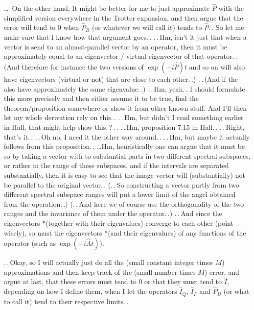 \documentclass{report}
\begin{document}
\ldots\ On the other hand, It might be better for me to just approximate $\hat P$ with the simplified version everywhere in the Trotter expansion, and then argue that the error will tend to 0 when $\hat P_B$ (or whatever we will call it) tends to $\hat P$.\,. So let me make sure that I know how that argument goes.\,. .\,.\,Hm, isn't it just that when a vector is send to an almost-parallel vector by an operator, then it must be approximately equal to an eigenvector / virtual eigenvector of that operator.\,. (And therefore for instance the two versions of $\exp(-i \hat P)t$ and so on will also have eigenvectors (virtual or not) that are close to each other.\,.) .\,.\,(And if the also have approximately the same eigenvalue.\,.) .\,.\,Hm, yeah.\,. I should formulate this more precisely and then either assume it to be true, find the theorem/proposition somewhere or show it from other known stuff. And I'll then let my whole derivation rely on this.\,. .\,.\,Hm, but didn't I read something earlier in Hall, that might help show this.\,?\,.\,. .\,.\,Hm, proposition 7.15 in Hall.\,. .\,.\,Right, that's it.\,. .\,.\,Oh no, I need it the other way around.\,. .\,.\,Hm, but maybe it actually follows from this proposition.\,. \ldots Hm, heuristically one can argue that it must be so by taking a vector with to substantial parts in two different spectral subspaces, or rather in the range of these subspaces, and if the intervals are separated substantially, then it is easy to see that the image vector will (substantially) not be parallel to the original vector.\,. (.\,.\,So constructing a vector partly from two different spectral subspace ranges will put a lower limit of the angel obtained from the operation.\,.) (.\,.\,And here we of course use the orthogonality of the two ranges and the invariance of them under the operator.\,.) .\,.\,And since the eigenvectors *(together with their eigenvalues) converge to each other (point-wisely), so must the eigenvectors *(and their eigenvalues) of any functions of the operator (such as $\exp(-i \hat A t)$). 

.\,.\,Okay, so I will actually just do all the (small constant integer times $M$) approximations and then keep track of the (small number times $M$) error, and argue at last, that these errors must tend to 0 or that they must tend to $\hat I$, depending on how I define them, when I let the operators $\hat I_Q$, $\hat I_P$ and $\hat P_B$ (or what to call it) tend to their respective limits.\,. %
\end{document}

